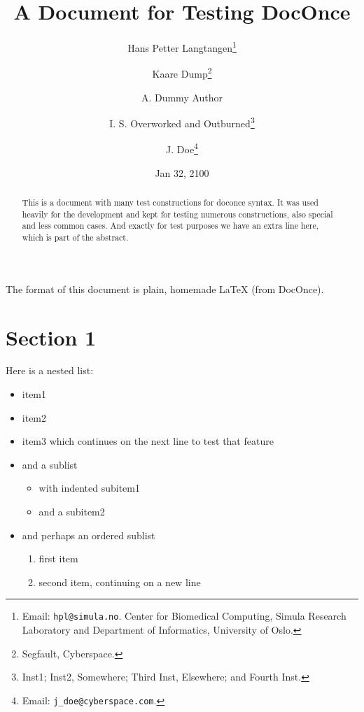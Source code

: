 \documentclass[%
oneside,                 %
final,                   %
10pt]{article}
\theoremstyle{definition}
\begin{document}
\newcommand{\exercisesection}[1]{\subsection*{#1}}


\title{A Document for Testing DocOnce}
\author{Hans Petter Langtangen\footnote{Email: \texttt{hpl@simula.no}. Center for Biomedical Computing, Simula Research Laboratory and Department of Informatics, University of Oslo.}
\and Kaare Dump\footnote{Segfault, Cyberspace.}
\and A. Dummy Author
\and I. S. Overworked and Outburned\footnote{Inst1; Inst2, Somewhere; Third Inst, Elsewhere; and Fourth Inst.}
\and J. Doe\footnote{Email: \texttt{j\_doe@cyberspace.com}.}}
\date{Jan 32, 2100}
\maketitle
\tableofcontents
\vspace{1cm} %
The format of this document is
plain, homemade {\LaTeX} (from DocOnce).
\begin{abstract}
This is a document with many test constructions for doconce syntax.
It was used heavily for the development and kept for testing
numerous constructions, also special and less common cases.
And exactly for test purposes we have an extra line here, which
is part of the abstract.
\end{abstract}
\section{Section 1}
\label{sec1}
Here is a nested list:
\begin{itemize}
  \item item1
  \item item2
  \item item3 which continues on the next line to test that feature
  \item and a sublist
\begin{itemize}
    \item with indented subitem1
    \item and a subitem2
\end{itemize}
\noindent
  \item and perhaps an ordered sublist
\begin{enumerate}
   \item first item
   \item second item, continuing on a new line
\end{enumerate}
\noindent
\end{itemize}
\noindent
\end{document}
